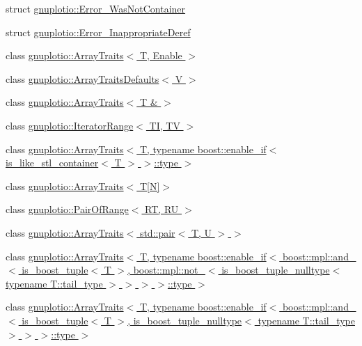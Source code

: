\begin{DoxyCompactItemize}
\item 
struct \hyperlink{structgnuplotio_1_1_error___was_not_container}{gnuplotio\+::\+Error\+\_\+\+Was\+Not\+Container}
\item 
struct \hyperlink{structgnuplotio_1_1_error___inappropriate_deref}{gnuplotio\+::\+Error\+\_\+\+Inappropriate\+Deref}
\item 
class \hyperlink{classgnuplotio_1_1_array_traits}{gnuplotio\+::\+Array\+Traits$<$ T, Enable $>$}
\item 
class \hyperlink{classgnuplotio_1_1_array_traits_defaults}{gnuplotio\+::\+Array\+Traits\+Defaults$<$ V $>$}
\item 
class \hyperlink{classgnuplotio_1_1_array_traits_3_01_t_01_6_01_4}{gnuplotio\+::\+Array\+Traits$<$ T \& $>$}
\item 
class \hyperlink{classgnuplotio_1_1_iterator_range}{gnuplotio\+::\+Iterator\+Range$<$ T\+I, T\+V $>$}
\item 
class \hyperlink{classgnuplotio_1_1_array_traits_3_01_t_00_01typename_01boost_1_1enable__if_3_01is__like__stl__co9e1736bbd08cd58c6993ab613a998887}{gnuplotio\+::\+Array\+Traits$<$ T, typename boost\+::enable\+\_\+if$<$ is\+\_\+like\+\_\+stl\+\_\+container$<$ T $>$ $>$\+::type $>$}
\item 
class \hyperlink{classgnuplotio_1_1_array_traits_3_01_t[_n]_4}{gnuplotio\+::\+Array\+Traits$<$ T\mbox{[}\+N\mbox{]}$>$}
\item 
class \hyperlink{classgnuplotio_1_1_pair_of_range}{gnuplotio\+::\+Pair\+Of\+Range$<$ R\+T, R\+U $>$}
\item 
class \hyperlink{classgnuplotio_1_1_array_traits_3_01std_1_1pair_3_01_t_00_01_u_01_4_01_4}{gnuplotio\+::\+Array\+Traits$<$ std\+::pair$<$ T, U $>$ $>$}
\item 
class \hyperlink{classgnuplotio_1_1_array_traits_3_01_t_00_01typename_01boost_1_1enable__if_3_01boost_1_1mpl_1_1a8de3a8fe198d85f7f5d28b9a2f5bf229}{gnuplotio\+::\+Array\+Traits$<$ T, typename boost\+::enable\+\_\+if$<$ boost\+::mpl\+::and\+\_\+$<$ is\+\_\+boost\+\_\+tuple$<$ T $>$, boost\+::mpl\+::not\+\_\+$<$ is\+\_\+boost\+\_\+tuple\+\_\+nulltype$<$ typename T\+::tail\+\_\+type $>$ $>$ $>$ $>$\+::type $>$}
\item 
class \hyperlink{classgnuplotio_1_1_array_traits_3_01_t_00_01typename_01boost_1_1enable__if_3_01boost_1_1mpl_1_1ad3fa8e75dccbaae12a06d17831678a88}{gnuplotio\+::\+Array\+Traits$<$ T, typename boost\+::enable\+\_\+if$<$ boost\+::mpl\+::and\+\_\+$<$ is\+\_\+boost\+\_\+tuple$<$ T $>$, is\+\_\+boost\+\_\+tuple\+\_\+nulltype$<$ typename T\+::tail\+\_\+type $>$ $>$ $>$\+::type $>$}

\end{DoxyCompactItemize}
